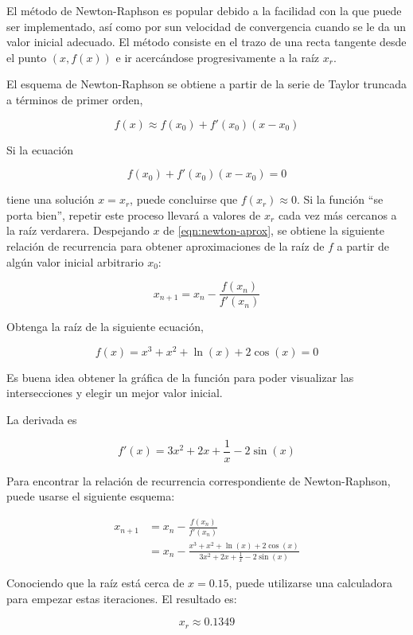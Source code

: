 El método de Newton-Raphson es popular debido a la facilidad con la que puede
ser implementado, así como por sun velocidad de convergencia cuando se le da un
valor inicial adecuado. El método consiste en el trazo de una recta tangente
desde el punto $(x, f(x))$ e ir acercándose progresivamente a la raíz $x_r$.

El esquema de Newton-Raphson se obtiene a partir de la serie de Taylor truncada
a términos de primer orden,

\[
    f(x) \approx f(x_0) + f'(x_0)(x - x_0)
\]

Si la ecuación

\begin{equation}
    f(x_0) + f'(x_0) (x - x_0) = 0 \label{eqn:newton-aprox}
\end{equation}

tiene una solución $x = x_r$, puede concluirse que $f(x_r) \approx 0$. Si la
función ``se porta bien'', repetir este proceso llevará a valores de $x_r$ cada
vez más cercanos a la raíz verdarera. Despejando $x$ de \ref{eqn:newton-aprox},
se obtiene la siguiente relación de recurrencia para obtener aproximaciones de
la raíz de $f$ a partir de algún valor inicial arbitrario $x_0$:

\begin{equation}\label{eqn:newton}
    \boxed{x_{n+1} = x_n - \frac{f(x_n)}{f'(x_n)}}
\end{equation}

\begin{ex}
    Obtenga la raíz de la siguiente ecuación,

    \[
        f(x) = x^3 + x^2 + \ln(x) + 2 \cos(x) = 0
    \]

    \begin{solution}

        Es buena idea obtener la gráfica de la función para poder visualizar
        las intersecciones y elegir un mejor valor inicial.

        La derivada es 

        \[
            f'(x) = 3x^2 + 2x + \frac{1}{x} - 2 \sin(x)
        \]

        Para encontrar la relación de recurrencia correspondiente de
        Newton-Raphson, puede usarse el siguiente esquema:

        \begin{align*}
            x_{n+1} &= x_n - \frac{f(x_n)}{f'(x_n)} \\
                &= x_n - \frac{x^3 + x^2 + \ln(x) + 2
                \cos(x)}{3x^2 + 2x + \frac{1}{x} - 2 \sin(x)}
        \end{align*}

        Conociendo que la raíz está cerca de $x = 0.15$, puede utilizarse una
        calculadora para empezar estas iteraciones. El resultado es:

        \[
            \boxed{x_r \approx 0.1349}
        \]

    \end{solution}

\end{ex}

